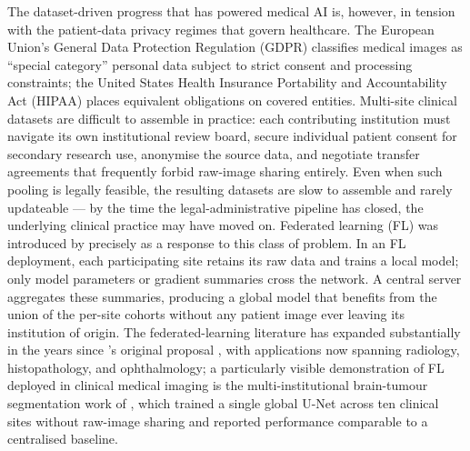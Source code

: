 \documentclass[11pt,a4paper]{article}
\begin{document}
The dataset-driven progress that has powered medical AI is, however,
in tension with the patient-data privacy regimes that govern
healthcare. The European Union's General Data Protection Regulation
(GDPR) classifies medical images as ``special category'' personal data
subject to strict consent and processing constraints; the United
States Health Insurance Portability and Accountability Act (HIPAA)
places equivalent obligations on covered entities. Multi-site clinical
datasets are difficult to assemble in practice: each contributing
institution must navigate its own institutional review board, secure
individual patient consent for secondary research use, anonymise the
source data, and negotiate transfer agreements that frequently forbid
raw-image sharing entirely. Even when such pooling is legally
feasible, the resulting datasets are slow to assemble and rarely
updateable --- by the time the legal-administrative pipeline has
closed, the underlying clinical practice may have moved on. Federated
learning (FL) was introduced by \citet{mcmahan2017fedavg} precisely as
a response to this class of problem. In an FL deployment, each
participating site retains its raw data and trains a local model;
only model parameters or gradient summaries cross the network. A
central server aggregates these summaries, producing a global model
that benefits from the union of the per-site cohorts without any
patient image ever leaving its institution of origin. The
federated-learning literature has expanded substantially in the years
since \citeauthor{mcmahan2017fedavg}'s original proposal
\citep{kairouz2021advances}, with applications now spanning radiology,
histopathology, and ophthalmology; a particularly visible
demonstration of FL deployed in clinical medical imaging is the
multi-institutional brain-tumour segmentation work of
\citet{sheller2020medicalfl}, which trained a single global U-Net
across ten clinical sites without raw-image sharing and reported
performance comparable to a centralised baseline.
\end{document}
